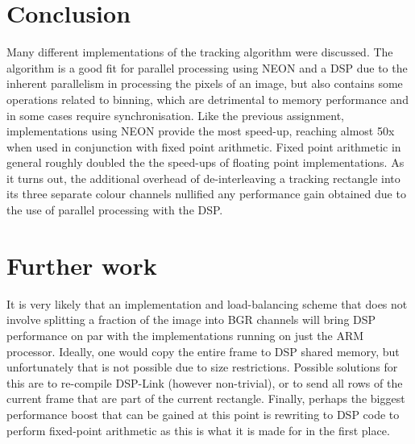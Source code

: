 \documentclass[final]{article}
\begin{document}
\section{Conclusion}
Many different implementations of the tracking algorithm were discussed.
The algorithm is a good fit for parallel processing using NEON and a DSP due to the inherent parallelism in processing the pixels of an image, but also contains some operations related to binning, which are detrimental to memory performance and in some cases require synchronisation.
Like the previous assignment, implementations using NEON provide the most speed-up, reaching almost 50x when used in conjunction with fixed point arithmetic.
Fixed point arithmetic in general roughly doubled the the speed-ups of floating point implementations.
As it turns out, the additional overhead of de-interleaving a tracking rectangle into its three separate colour channels nullified any performance gain obtained due to the use of parallel processing with the DSP.

\section{Further work}
It is very likely that an implementation and load-balancing scheme that does not involve splitting a fraction of the image into BGR channels will bring DSP performance on par with the implementations running on just the ARM processor.
Ideally, one would copy the entire frame to DSP shared memory, but unfortunately that is not possible due to size restrictions.
Possible solutions for this are to re-compile DSP-Link (however non-trivial), or to send all rows of the current frame that are part of the current rectangle.
Finally, perhaps the biggest performance boost that can be gained at this point is rewriting to DSP code to perform fixed-point arithmetic as this is what it is made for in the first place.
\end{document}
